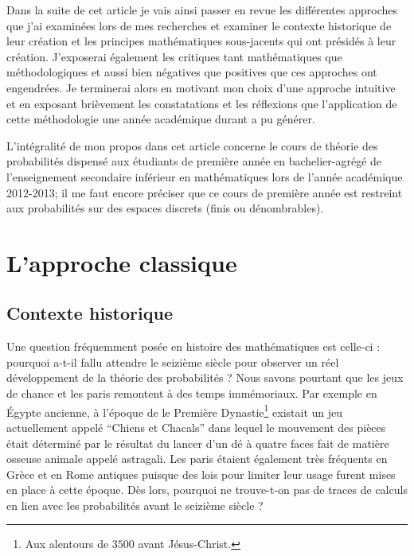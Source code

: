 \documentclass[11pt,a4paper]{article}
\begin{document}
Dans la suite de cet article je vais ainsi passer en revue les différentes approches que j'ai examinées lors de mes recherches et examiner le contexte historique de leur création et les principes mathématiques sous-jacents qui ont présidés à leur création. J'exposerai également les critiques tant mathématiques que méthodologiques et aussi bien négatives que positives que ces approches ont engendrées. Je terminerai alors en motivant mon choix d'une approche intuitive et en exposant brièvement les constatations et les réflexions que l'application de cette méthodologie une année académique durant a pu générer.

L'intégralité de mon propos dans cet article concerne le cours de théorie des probabilités dispensé aux étudiants de première année en bachelier-agrégé de l'enseignement secondaire inférieur en mathématiques lors de l'année académique 2012-2013; il me faut encore préciser que ce cours de première année est restreint aux probabilités sur des espaces discrets (finis ou dénombrables).


\section{L'approche classique}

\subsection{Contexte historique}

Une question fréquemment posée en histoire des mathématiques est celle-ci : pourquoi a-t-il fallu attendre le seizième siècle pour observer un réel développement de la théorie des probabilités ? Nous savons pourtant que les jeux de chance et les paris remontent à des temps immémoriaux. Par exemple en Égypte ancienne, à l'époque de le Première Dynastie\footnote{Aux alentours de $3500$ avant Jésus-Christ.} existait un jeu actuellement appelé ``Chiens et Chacals'' dans lequel le mouvement des pièces était déterminé par le résultat du lancer d'un dé à quatre faces fait de matière osseuse animale appelé astragali. Les paris étaient également très fréquents en Grèce et en Rome antiques puisque des lois pour limiter leur usage furent mises en place à cette époque. Dès lors, pourquoi ne trouve-t-on pas de traces de calculs en lien avec les probabilités avant le seizième siècle ?
\end{document}
